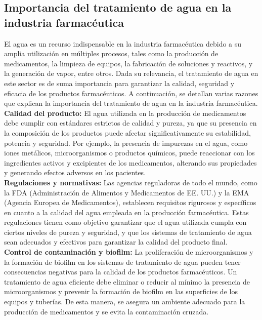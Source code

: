 \subsection{ Importancia del tratamiento de agua en la industria farmacéutica}
El agua es un recurso indispensable en la industria farmacéutica debido a su amplia utilización en múltiples procesos, tales como la producción de medicamentos, la limpieza de equipos, la fabricación de soluciones y reactivos, y la generación de vapor, entre otros. Dada su relevancia, el tratamiento de agua en este sector es de suma importancia para garantizar la calidad, seguridad y eficacia de los productos farmacéuticos. A continuación, se detallan varias razones que explican la importancia del tratamiento de agua en la industria farmacéutica.\\

\textbf{Calidad del producto:} El agua utilizada en la producción de medicamentos debe cumplir con estándares estrictos de calidad y pureza, ya que su presencia en la composición de los productos puede afectar significativamente su estabilidad, potencia y seguridad. Por ejemplo, la presencia de impurezas en el agua, como iones metálicos, microorganismos o productos químicos, puede reaccionar con los ingredientes activos y excipientes de los medicamentos, alterando sus propiedades y generando efectos adversos en los pacientes.\\

\textbf{Regulaciones y normativas:} Las agencias reguladoras de todo el mundo, como la FDA (Administración de Alimentos y Medicamentos de EE. UU.) y la EMA (Agencia Europea de Medicamentos), establecen requisitos rigurosos y específicos en cuanto a la calidad del agua empleada en la producción farmacéutica. Estas regulaciones tienen como objetivo garantizar que el agua utilizada cumpla con ciertos niveles de pureza y seguridad, y que los sistemas de tratamiento de agua sean adecuados y efectivos para garantizar la calidad del producto final.\\

\textbf{Control de contaminación y biofilm:} La proliferación de microorganismos y la formación de biofilm en los sistemas de tratamiento de agua pueden tener consecuencias negativas para la calidad de los productos farmacéuticos. Un tratamiento de agua eficiente debe eliminar o reducir al mínimo la presencia de microorganismos y prevenir la formación de biofilm en las superficies de los equipos y tuberías. De esta manera, se asegura un ambiente adecuado para la producción de medicamentos y se evita la contaminación cruzada.\\

